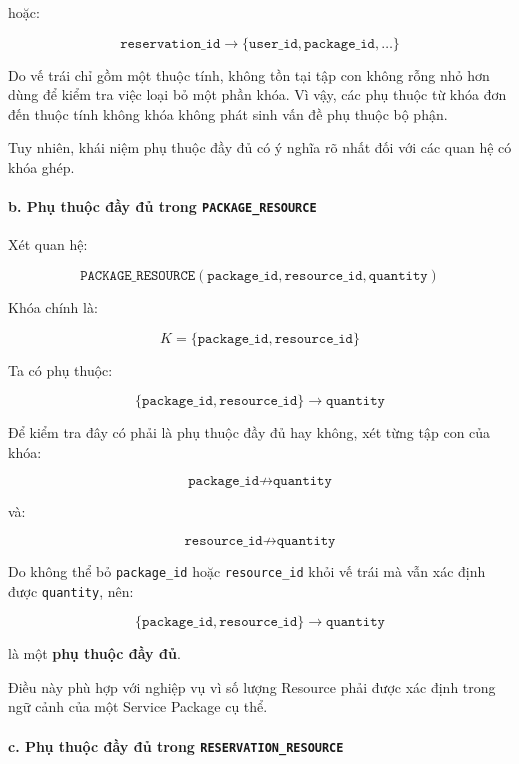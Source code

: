 hoặc:

$$
\texttt{reservation\_id}
\rightarrow
\{
\texttt{user\_id},
\texttt{package\_id},
\ldots
\}
$$

Do vế trái chỉ gồm một thuộc tính, không tồn tại tập con không rỗng nhỏ hơn dùng để kiểm tra việc loại bỏ một phần khóa. Vì vậy, các phụ thuộc từ khóa đơn đến thuộc tính không khóa không phát sinh vấn đề phụ thuộc bộ phận.

Tuy nhiên, khái niệm phụ thuộc đầy đủ có ý nghĩa rõ nhất đối với các quan hệ có khóa ghép.

\paragraph{b. Phụ thuộc đầy đủ trong \texttt{PACKAGE\_RESOURCE}}\mbox{}\par

Xét quan hệ:

$$
\texttt{PACKAGE\_RESOURCE}(
\texttt{package\_id},
\texttt{resource\_id},
\texttt{quantity})
$$

Khóa chính là:

$$
K =
\{
\texttt{package\_id},
\texttt{resource\_id}
\}
$$

Ta có phụ thuộc:

$$
\{
\texttt{package\_id},
\texttt{resource\_id}
\}
\rightarrow
\texttt{quantity}
$$

Để kiểm tra đây có phải là phụ thuộc đầy đủ hay không, xét từng tập con của khóa:

$$
\texttt{package\_id}
\not\rightarrow
\texttt{quantity}
$$

và:

$$
\texttt{resource\_id}
\not\rightarrow
\texttt{quantity}
$$

Do không thể bỏ \texttt{package\_id} hoặc \texttt{resource\_id} khỏi vế trái mà vẫn xác định được \texttt{quantity}, nên:

$$
\{
\texttt{package\_id},
\texttt{resource\_id}
\}
\rightarrow
\texttt{quantity}
$$

là một \textbf{phụ thuộc đầy đủ}.

Điều này phù hợp với nghiệp vụ vì số lượng Resource phải được xác định trong ngữ cảnh của một Service Package cụ thể.

\paragraph{c. Phụ thuộc đầy đủ trong \texttt{RESERVATION\_RESOURCE}}\mbox{}\par


